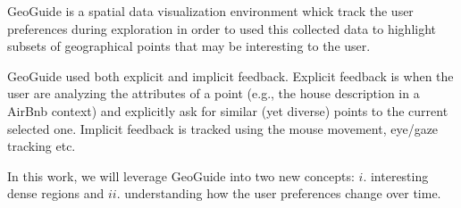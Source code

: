 GeoGuide \cite{omidvarTehrani2017} is a spatial data visualization environment whick track the user preferences during exploration in order to used this collected data to highlight subsets of geographical points that may be interesting to the user.

GeoGuide used both explicit and implicit feedback. Explicit feedback is when the user are analyzing the attributes of a point (e.g., the house description in a AirBnb context) and explicitly ask for similar (yet diverse) points to the current selected one. Implicit feedback is tracked using the mouse movement, eye/gaze tracking etc.

In this work, we will leverage GeoGuide into two new concepts: $i$. interesting dense regions and $ii$. understanding how the user preferences change over time.